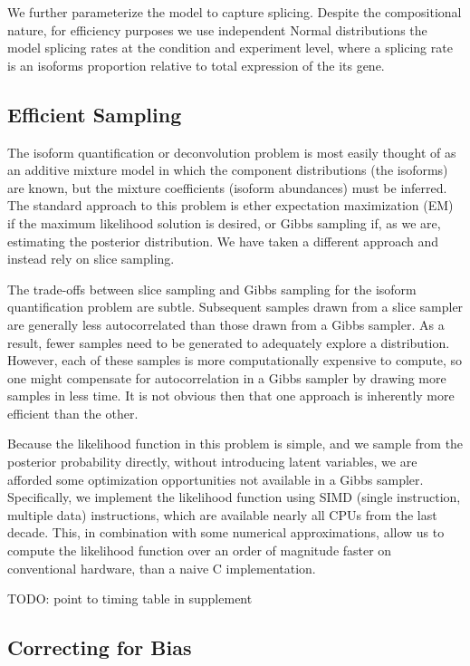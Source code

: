 \documentclass[twocolumn]{article}
\begin{document}
We further parameterize the model to capture splicing. Despite the
compositional nature, for efficiency purposes we use independent Normal
distributions the model splicing rates at the condition and experiment
level, where a splicing rate is an isoforms proportion relative to total
expression of the its gene.

\subsection{Efficient Sampling}\label{efficient-sampling}

The isoform quantification or deconvolution problem is most easily
thought of as an additive mixture model in which the component
distributions (the isoforms) are known, but the mixture coefficients
(isoform abundances) must be inferred. The standard approach to this
problem is ether expectation maximization (EM) if the maximum likelihood
solution is desired, or Gibbs sampling if, as we are, estimating the
posterior distribution. We have taken a different approach and instead
rely on slice sampling.

The trade-offs between slice sampling and Gibbs sampling for the isoform
quantification problem are subtle. Subsequent samples drawn from a slice
sampler are generally less autocorrelated than those drawn from a Gibbs
sampler. As a result, fewer samples need to be generated to adequately
explore a distribution. However, each of these samples is more
computationally expensive to compute, so one might compensate for
autocorrelation in a Gibbs sampler by drawing more samples in less time.
It is not obvious then that one approach is inherently more efficient
than the other.

Because the likelihood function in this problem is simple, and we sample
from the posterior probability directly, without introducing latent
variables, we are afforded some optimization opportunities not available
in a Gibbs sampler. Specifically, we implement the likelihood function
using SIMD (single instruction, multiple data) instructions, which are
available nearly all CPUs from the last decade. This, in combination
with some numerical approximations, allow us to compute the likelihood
function over an order of magnitude faster on conventional hardware,
than a naive C implementation.

TODO: point to timing table in supplement

\subsection{Correcting for Bias}\label{correcting-for-bias}
\end{document}
